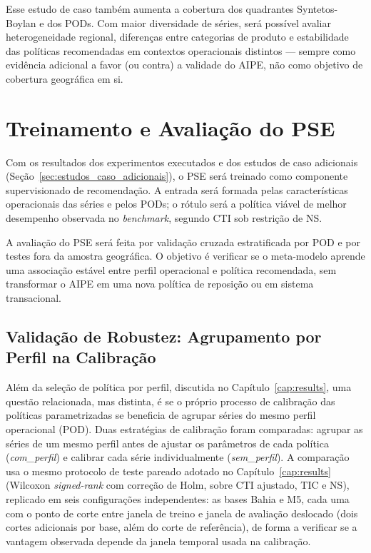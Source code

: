 Esse estudo de caso também aumenta a cobertura dos quadrantes Syntetos-Boylan e dos PODs. Com maior diversidade de séries, será possível avaliar heterogeneidade regional, diferenças entre categorias de produto e estabilidade das políticas recomendadas em contextos operacionais distintos — sempre como evidência adicional a favor (ou contra) a validade do AIPE, não como objetivo de cobertura geográfica em si.

\section{Treinamento e Avaliação do PSE}

Com os resultados dos experimentos executados e dos estudos de caso adicionais (Seção~\ref{sec:estudos_caso_adicionais}), o PSE será treinado como componente supervisionado de recomendação. A entrada será formada pelas características operacionais das séries e pelos PODs; o rótulo será a política viável de melhor desempenho observada no \textit{benchmark}, segundo CTI sob restrição de NS.

A avaliação do PSE será feita por validação cruzada estratificada por POD e por testes fora da amostra geográfica. O objetivo é verificar se o meta-modelo aprende uma associação estável entre perfil operacional e política recomendada, sem transformar o AIPE em uma nova política de reposição ou em sistema transacional.

\subsection{Validação de Robustez: Agrupamento por Perfil na Calibração}
\label{sec:robustez_pooling}

Além da seleção de política por perfil, discutida no Capítulo~\ref{cap:results}, uma questão relacionada, mas distinta, é se o próprio processo de calibração das políticas parametrizadas se beneficia de agrupar séries do mesmo perfil operacional (POD). Duas estratégias de calibração foram comparadas: agrupar as séries de um mesmo perfil antes de ajustar os parâmetros de cada política (\textit{com\_perfil}) e calibrar cada série individualmente (\textit{sem\_perfil}). A comparação usa o mesmo protocolo de teste pareado adotado no Capítulo~\ref{cap:results} (Wilcoxon \textit{signed-rank} com correção de Holm, sobre CTI ajustado, TIC e NS), replicado em seis configurações independentes: as bases Bahia e M5, cada uma com o ponto de corte entre janela de treino e janela de avaliação deslocado (dois cortes adicionais por base, além do corte de referência), de forma a verificar se a vantagem observada depende da janela temporal usada na calibração.


